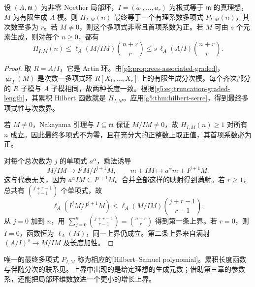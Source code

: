 \begin{proposition}\label{g5:prop:hilbert-samuel-polynomial}
	设 \((A,\mathfrak m)\) 为非零 Noether 局部环，\(I=(a_1,\ldots,a_r)\) 为根式等于 \(\mathfrak m\) 的真理想，\(M\) 为有限生成 \(A\) 模。则 \(H_{I,M}(n)\) 最终等于一个有理系数多项式 \(P_{I,M}(n)\)，其次数至多为 \(r\)。若 \(M\ne0\)，则这个多项式非零且首项系数为正。若 \(M\) 可由 \(s\) 个元素生成，则对每个 \(n\geq0\)，都有
	\begin{equation}\label{g5:eq:ideal-generators-growth-bound}
		H_{I,M}(n)\leq
		\ell_A(M/IM)\binom{n+r}{r}
		\leq s\,\ell_A(A/I)\binom{n+r}{r}.
	\end{equation}
\end{proposition}
\begin{proof}
	取 \(R=A/I\)，它是 Artin 环。由\cref{g5:prop:rees-associated-graded}，\(\operatorname{gr}_I(M)\) 是次数一多项式环
	\(R[X_1,\ldots,X_r]\) 上的有限生成分次模。每个齐次部分的 \(R\) 子模与 \(A\) 子模相同，故两种长度一致。根据\eqref{g5:eq:truncation-graded-length}，其累积 Hilbert 函数就是 \(H_{I,M}\)。应用\cref{g5:thm:hilbert-serre}，得到最终多项式性与次数界。

	若 \(M\ne0\)，Nakayama 引理与 \(I\subseteq\mathfrak m\) 保证 \(M/IM\ne0\)，故 \(H_{I,M}(n)\geq1\) 对所有 \(n\) 成立。因此最终多项式不为零，且在充分大的正整数上取正值，其首项系数必为正。

	对每个总次数为 \(j\) 的单项式 \(a^\alpha\)，乘法诱导
	\[
		M/IM\longrightarrow I^jM/I^{j+1}M,\qquad
		m+IM\longmapsto a^\alpha m+I^{j+1}M.
	\]
	这与代表无关，因为 \(a^\alpha IM\subseteq I^{j+1}M\)。合并全部这样的映射得到满射。若 \(r\geq1\)，总共有 \(\binom{j+r-1}{r-1}\) 个单项式，故
	\[
		\ell_A(I^jM/I^{j+1}M)
		\leq\ell_A(M/IM)\binom{j+r-1}{r-1}.
	\]
	从 \(j=0\) 加到 \(n\)，用
	\(\sum_{j=0}^n\binom{j+r-1}{r-1}=\binom{n+r}{r}\)
	得到第一条上界。若 \(r=0\)，则 \(I=0\)，函数恒为 \(\ell_A(M)\)，同一上界仍成立。第二条上界来自满射
	\((A/I)^s\to M/IM\) 及长度加性。
\end{proof}

唯一的最终多项式 \(P_{I,M}\) 称为相应的[Hilbert--Samuel polynomial]。累积长度函数与伴随分次的联系见\cite[第13节，第97--98页]{Matsumura1989}。上界中出现的是给定理想的生成元数；借助第三章的参数系，还能把局部环维数放进一个更小的增长上界。

